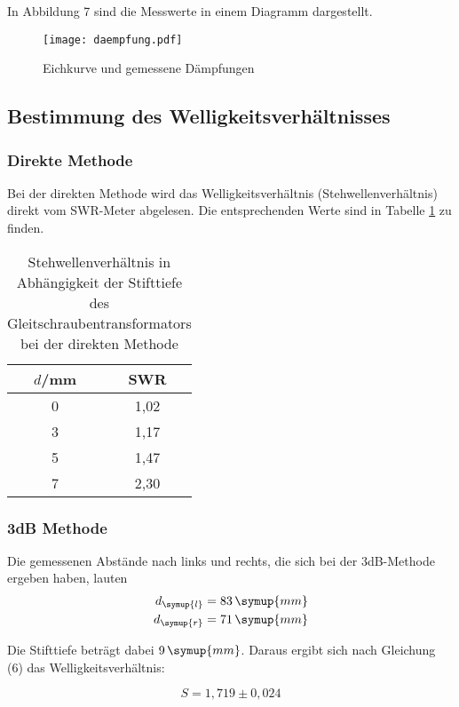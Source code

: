 In Abbildung 7 sind die Messwerte in einem Diagramm dargestellt.

\begin{figure}
  \centering
  \texttt{[image: daempfung.pdf]}
  \caption{Eichkurve und gemessene Dämpfungen}
  \label{fig:plot}
\end{figure}

\subsection{Bestimmung des Welligkeitsverhältnisses}
\subsubsection{Direkte Methode}
Bei der direkten Methode wird das Welligkeitsverhältnis (Stehwellenverhältnis) direkt
vom SWR-Meter abgelesen. Die entsprechenden Werte sind in Tabelle \ref{tab:direkt} zu finden.

\begin{table}[H]
  \centering
  \caption{Stehwellenverhältnis in Abhängigkeit der Stifttiefe des Gleitschraubentransformators bei der direkten Methode}
  \label{tab:direkt}
  \begin{tabular}{c c}
    \toprule
    $d$/mm & SWR \\
    \midrule
    0 &  1,02    \\
    3 &  1,17    \\
    5 &  1,47    \\
    7 &  2,30    \\
    \bottomrule
  \end{tabular}
\end{table}

\subsubsection{3dB Methode}
Die gemessenen Abstände nach links und rechts, die sich bei der 3dB-Methode ergeben haben,
lauten
\begin{align*}
  d_\symup{l} &= 83\, \symup{mm} \\
  d_\symup{r} &= 71\, \symup{mm}
\end{align*}

Die Stifttiefe beträgt dabei $9\, \symup{mm}$.
Daraus ergibt sich nach Gleichung (6) das Welligkeitsverhältnis:

\begin{equation*}
  S = 1,719 \pm 0,024
\end{equation*}

